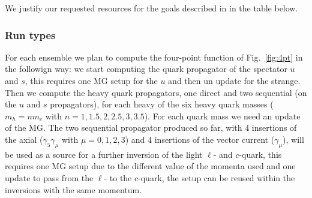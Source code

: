 

We justify our requested resources for the goals described
in  in the table below.

\subsubsection{Run types \label{sec:runtypes}}

For each ensemble we plan to compute the four-point function of Fig.~\ref{fig:4pt} in the followign way: we start computing the quark propagator of the spectator $u$ and $s$, this requires
one MG setup for the $u$ and then un update for the strange.
Then we compute the heavy quark propagators, one direct and two sequential (on the $u$ and $s$ propagators), for each heavy of the six heavy quark masses ($m_h=n m_c$ with $n=1, 1.5, 2, 2.5, 3, 3.5$). For each quark mass we need an update of the MG.
The two sequential propagator produced so far, with 4 insertions of the axial ($\gamma_5\gamma_\mu$ with $\mu=0,1,2,3$) and 4 insertions of the vector current ($\gamma_\mu$), will be used as a source for a further inversion of the light $\ell$- and $c$-quark, this requires one MG setup due to the different value of the momenta used and one update to pass from the $\ell$- to the $c$-quark, the setup can be reused within the inversions with the same momentum.

